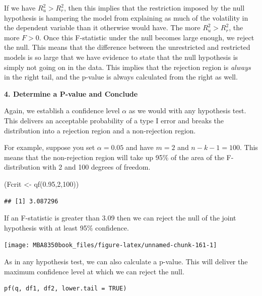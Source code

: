 \documentclass[
]{book}
\newenvironment{Shaded}{\begin{snugshade}}{\end{snugshade}}
\newcommand{\DecValTok}[1]{\textcolor[rgb]{0.00,0.00,0.81}{#1}}
\newcommand{\FloatTok}[1]{\textcolor[rgb]{0.00,0.00,0.81}{#1}}
\newcommand{\FunctionTok}[1]{\textcolor[rgb]{0.00,0.00,0.00}{#1}}
\newcommand{\NormalTok}[1]{#1}
\newcommand{\OtherTok}[1]{\textcolor[rgb]{0.56,0.35,0.01}{#1}}
\begin{document}
If we have \(R^2_u > R^2_r\), then this implies that the restriction imposed by the null hypothesis is hampering the model from explaining as much of the volatility in the dependent variable than it otherwise would have. The more \(R^2_u > R^2_r\), the more \(F>0\). Once this F-statistic under the null becomes large enough, we reject the null. This means that the difference between the unrestricted and restricted models is so large that we have evidence to state that the null hypothesis is simply not going on in the data. This implies that the rejection region is \emph{always} in the right tail, and the p-value is always calculated from the right as well.

\textbf{4. Determine a P-value and Conclude}

Again, we establish a confidence level \(\alpha\) as we would with any hypothesis test. This delivers an acceptable probability of a type I error and breaks the distribution into a rejection region and a non-rejection region.

For example, suppose you set \(\alpha = 0.05\) and have \(m=2\) and \(n-k-1 = 100\). This means that the non-rejection region will take up 95\% of the area of the F-distribution with 2 and 100 degrees of freedom.

\begin{Shaded}
\begin{Highlighting}[]
\NormalTok{(Fcrit }\OtherTok{\textless{}{-}} \FunctionTok{qf}\NormalTok{(}\FloatTok{0.95}\NormalTok{,}\DecValTok{2}\NormalTok{,}\DecValTok{100}\NormalTok{))}
\end{Highlighting}
\end{Shaded}

\begin{verbatim}
## [1] 3.087296
\end{verbatim}

If an F-statistic is greater than 3.09 then we can reject the null of the joint hypothesis with at least 95\% confidence.

\begin{center}\texttt{[image: MBA8350book\_files/figure-latex/unnamed-chunk-161-1]} \end{center}

As in any hypothesis test, we can also calculate a p-value. This will deliver the maximum confidence level at which we can reject the null.

\begin{verbatim}
pf(q, df1, df2, lower.tail = TRUE)
\end{verbatim}
\end{document}
